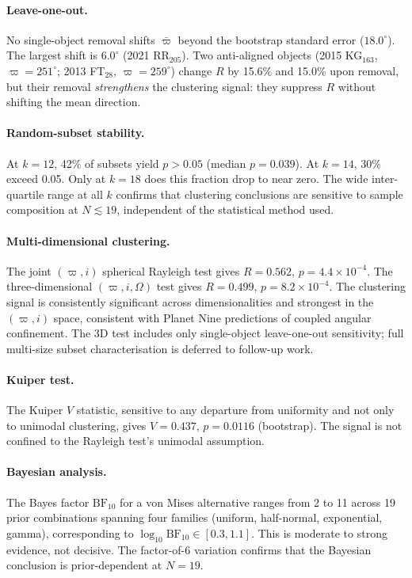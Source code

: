 \documentclass[usenatbib]{mnras}
\begin{document}
\paragraph{Leave-one-out.}
No single-object removal shifts $\bar{\varpi}$ beyond the bootstrap standard error ($18.0^\circ$). The largest shift is $6.0^\circ$ (2021 RR$_{205}$). Two anti-aligned objects (2015 KG$_{163}$, $\varpi=251^\circ$; 2013 FT$_{28}$, $\varpi=259^\circ$) change $R$ by 15.6\% and 15.0\% upon removal, but their removal \textit{strengthens} the clustering signal: they suppress $R$ without shifting the mean direction.

\paragraph{Random-subset stability.}
At $k=12$, 42\% of subsets yield $p>0.05$ (median $p=0.039$). At $k=14$, 30\% exceed 0.05. Only at $k=18$ does this fraction drop to near zero. The wide inter-quartile range at all $k$ confirms that clustering conclusions are sensitive to sample composition at $N\lesssim19$, independent of the statistical method used.

\paragraph{Multi-dimensional clustering.}
The joint $(\varpi, i)$ spherical Rayleigh test gives $R=0.562$, $p=4.4\times10^{-4}$. The three-dimensional $(\varpi, i, \Omega)$ test gives $R=0.499$, $p=8.2\times10^{-4}$. The clustering signal is consistently significant across dimensionalities and strongest in the $(\varpi, i)$ space, consistent with Planet Nine predictions of coupled angular confinement. The 3D test includes only single-object leave-one-out sensitivity; full multi-size subset characterisation is deferred to follow-up work.

\paragraph{Kuiper test.}
The Kuiper $V$ statistic, sensitive to any departure from uniformity and not only to unimodal clustering, gives $V=0.437$, $p=0.0116$ (bootstrap). The signal is not confined to the Rayleigh test's unimodal assumption.

\paragraph{Bayesian analysis.}
The Bayes factor $\mathrm{BF}_{10}$ for a von Mises alternative ranges from 2 to 11 across 19 prior combinations spanning four families (uniform, half-normal, exponential, gamma), corresponding to $\log_{10}\mathrm{BF}_{10}\in[0.3,1.1]$. This is moderate to strong evidence, not decisive. The factor-of-6 variation confirms that the Bayesian conclusion is prior-dependent at $N=19$.
\end{document}
